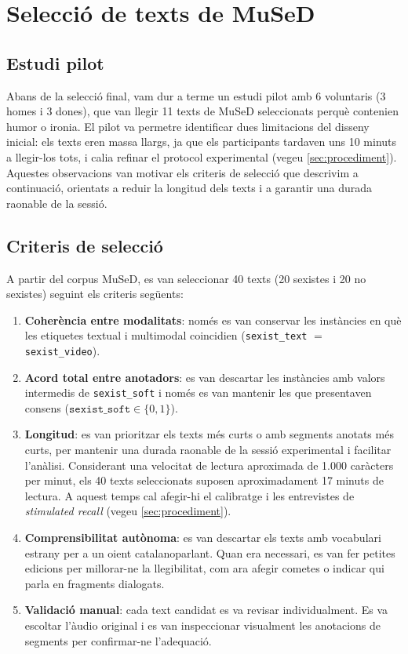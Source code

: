 \section{Selecció de texts de MuSeD}\label{sec:filtratge}

\subsection{Estudi pilot}

Abans de la selecció final, vam dur a terme un estudi pilot amb 6 voluntaris (3 homes i 3 dones), que van llegir 11 texts de MuSeD seleccionats perquè contenien humor o ironia.
El pilot va permetre identificar dues limitacions del disseny inicial: els texts eren massa llargs, ja que els participants tardaven uns 10 minuts a llegir-los tots, i calia refinar el protocol experimental (vegeu \autoref{sec:procediment}).
Aquestes observacions van motivar els criteris de selecció que descrivim a continuació, orientats a reduir la longitud dels texts i a garantir una durada raonable de la sessió.

\subsection{Criteris de selecció}

A partir del corpus MuSeD, es van seleccionar 40 texts (20 sexistes i 20 no sexistes) seguint els criteris següents:

\begin{enumerate}
    \item \textbf{Coherència entre modalitats}: només es van conservar les instàncies en què les etiquetes textual i multimodal coincidien (\texttt{sexist\_text} $=$ \texttt{sexist\_video}).
    \item \textbf{Acord total entre anotadors}: es van descartar les instàncies amb valors intermedis de \texttt{sexist\_soft} i només es van mantenir les que presentaven consens ($\texttt{sexist\_soft} \in \{0, 1\}$).
    \item \textbf{Longitud}: es van prioritzar els texts més curts o amb segments anotats més curts, per mantenir una durada raonable de la sessió experimental i facilitar l'anàlisi.
    Considerant una velocitat de lectura aproximada de 1.000 caràcters per minut, els 40 texts seleccionats suposen aproximadament 17 minuts de lectura. A aquest temps cal afegir-hi el calibratge i les entrevistes de \textit{stimulated recall} (vegeu \autoref{sec:procediment}).
    \item \textbf{Comprensibilitat autònoma}: es van descartar els texts amb vocabulari estrany per a un oient catalanoparlant.
    Quan era necessari, es van fer petites edicions per millorar-ne la llegibilitat, com ara afegir cometes o indicar qui parla en fragments dialogats.
    \item \textbf{Validació manual}: cada text candidat es va revisar individualment. Es va escoltar l'àudio original i es van inspeccionar visualment les anotacions de segments per confirmar-ne l'adequació.
\end{enumerate}



